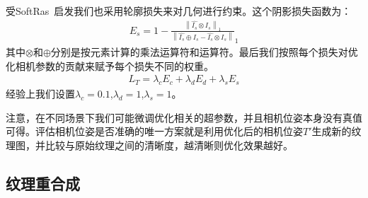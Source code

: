 受SoftRas~\cite{ShichenLiu2019SoftRA}启发我们也采用轮廓损失来对几何进行约束。这个阴影损失函数为：
\begin{align}
	E_s = 1 - \frac{\left \| \hat{I_s}\otimes I_s  \right \|_1 }{\left \| \hat{I_s}\oplus  I_s- \hat{I_s}\otimes I_s \right \| }_1  
\end{align}
其中$\otimes $和$\oplus $分别是按元素计算的乘法运算符和运算符。最后我们按照每个损失对优化相机参数的贡献来赋予每个损失不同的权重。
\begin{align}
	L_T = \lambda_c E_c + \lambda_d E_d +\lambda_s E_s \label{pose}
\end{align}经验上我们设置$\lambda_c = 0.1$,$\lambda_d = 1$,$\lambda_s = 1$。\par
注意，在不同场景下我们可能微调优化相关的超参数，并且相机位姿本身没有真值可得。评估相机位姿是否准确的唯一方案就是利用优化后的相机位姿$T'$生成新的纹理图，并比较与原始纹理之间的清晰度，越清晰则优化效果越好。

\subsection{纹理重合成}


